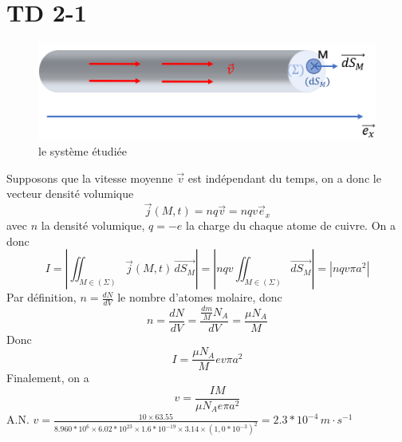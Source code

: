 \documentclass[a4paper,12pt]{book}
\begin{document}
\section{TD 2-1}
\begin{figure}[h]
    \begin{center}
    \includegraphics[scale=0.6]{elec12.png}
    \end{center}
    \caption{le système étudiée}
\end{figure}
Supposons que la vitesse moyenne $\vec{v}$ est indépendant du temps, on a donc le vecteur densité volumique 
$$
\vec{j}(M,t)=nq\vec{v}=nqv\vec{e}_x
$$
avec $n$ la densité volumique, $q=-e$ la charge du chaque atome de cuivre. 
On a donc 
$$
I=\left|\iint_{M \in (\Sigma)}\vec{j}(M,t)\,\vec{dS_M}\right|=\left|nqv\iint_{M \in (\Sigma)}\vec{dS_M}\right|=\left|nqv\pi a^2\right|
$$ 
Par définition, $n=\frac{dN}{dV}$ le nombre d'atomes molaire, donc 
$$
n=\frac{dN}{dV}=\frac{\frac{dm}{M}N_A}{dV}=\frac{\mu N_A}{M}
$$
Donc 
$$
I=\frac{\mu N_A}{M}ev\pi a^2
$$
Finalement, on a 
$$
\boxed{v=\frac{IM}{\mu N_Ae\pi a^2}}
$$
A.N. $\boxed{v=\frac{10\times 63.55}{8.960*10^6\times 6.02*10^23\times 1.6*10^{-19}\times 3.14\times (1,0*10^{-3})^2}=2.3*10^{-4}\,m\cdot s^{-1}}$
\end{document}
